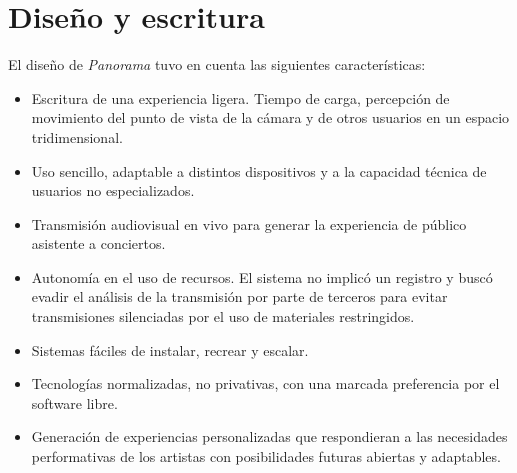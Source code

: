 
\section*{Diseño y escritura} %

\color{BlueGreen}


\color{black}

El diseño de \textit{Panorama} tuvo en cuenta las siguientes características:

\begin{itemize}
\item Escritura de una experiencia ligera. Tiempo de carga, percepción de movimiento del punto de vista de la cámara y de otros usuarios en un espacio tridimensional.  
\item Uso sencillo, adaptable a distintos dispositivos y a la capacidad técnica de usuarios no especializados.
\item Transmisión audiovisual en vivo para generar la experiencia de público asistente a conciertos. 
\item Autonomía en el uso de recursos. El sistema no implicó un registro y buscó evadir el análisis de la transmisión por parte de terceros para evitar transmisiones silenciadas por el uso de materiales restringidos. %
\item Sistemas fáciles de instalar, recrear y escalar.
\item Tecnologías normalizadas, no privativas, con una marcada preferencia por el software libre.
\item Generación de experiencias personalizadas que respondieran a las necesidades performativas de los artistas con posibilidades futuras abiertas y adaptables. 
\end{itemize}

